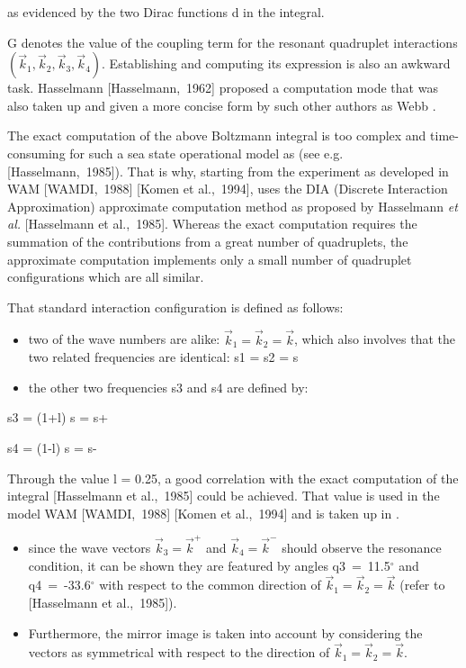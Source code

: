  as evidenced by the two Dirac functions d in the integral.

 G denotes the value of the coupling term for the resonant quadruplet interactions$\left(\vec{k}_{1} ,\vec{k}_{2} ,\vec{k}_{3} ,\vec{k}_{4} \right)$. Establishing and computing its expression is also an awkward task. Hasselmann [Hasselmann,~1962] proposed a computation mode that was also taken up and given a more concise form by such other authors as Webb \cite{webb1978}.

 The exact computation of the above Boltzmann integral is too complex and time-consuming for such a sea state operational model as \tomawac (see e.g. [Hasselmann,~1985]). That is why, starting from the experiment as developed in WAM [WAMDI,~1988] [Komen et al.,~1994], \tomawac uses the DIA (Discrete Interaction Approximation) approximate computation method as proposed by Hasselmann \textit{et al.} [Hasselmann et al.,~1985]. Whereas the exact computation requires the summation of the contributions from a great number of quadruplets, the approximate computation implements only a small number of quadruplet configurations which are all similar.

 That standard interaction configuration is defined as follows:

\begin{itemize}
\item  two of the wave numbers are alike: $\vec{k}_{1} =\vec{k}_{2} =\vec{k}$, which also involves that the two related frequencies are identical: s1 = s2 = s

\item  the other two frequencies s3 and s4 are defined by:
\end{itemize}

  s3 = (1+l) s = s+

  s4 = (1-l) s = s-

 Through the value l = 0.25, a good correlation with the exact computation of the integral [Hasselmann et al.,~1985] could be achieved. That value is used in the model WAM [WAMDI,~1988] [Komen et al.,~1994] and is taken up in \tomawac.

\begin{itemize}
\item  since the wave vectors $\vec{k}_{3} =\vec{k}^{+} $ and $\vec{k}_{4} =\vec{k}^{-} $ should observe the resonance condition, it can be shown they are featured by angles q3~=~11.5${}^\circ$ and q4~=~-33.6${}^\circ$ with respect to the common direction of $\vec{k}_{1} =\vec{k}_{2} =\vec{k}$ (refer to [Hasselmann et al.,~1985]).

\item  Furthermore, the mirror image is taken into account by considering the vectors as symmetrical with respect to the direction of $\vec{k}_{1} =\vec{k}_{2} =\vec{k}$.
\end{itemize}

